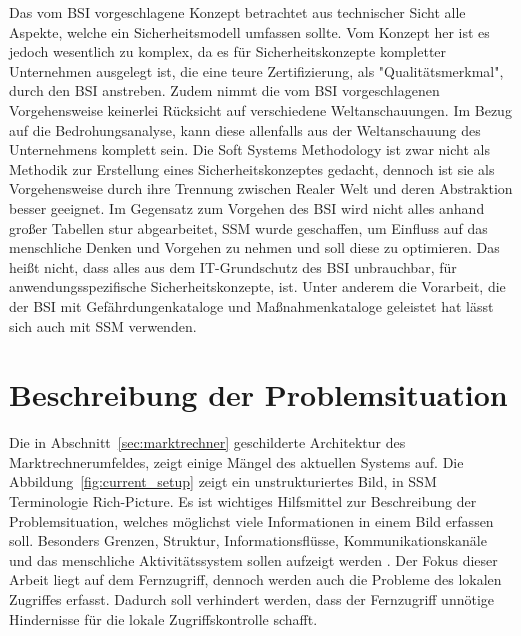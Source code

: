 \documentclass[11pt,a4paper]{report}
\begin{document}
Das vom BSI vorgeschlagene Konzept betrachtet aus technischer Sicht alle Aspekte, welche ein Sicherheitsmodell umfassen sollte. Vom Konzept her ist es jedoch wesentlich zu komplex, da es für Sicherheitskonzepte kompletter Unternehmen ausgelegt ist, die eine teure Zertifizierung, als "Qualitätsmerkmal", durch den BSI anstreben. Zudem nimmt die vom BSI vorgeschlagenen Vorgehensweise keinerlei Rücksicht auf verschiedene Weltanschauungen. Im Bezug auf die Bedrohungsanalyse, kann diese allenfalls aus der Weltanschauung des Unternehmens komplett sein. Die Soft Systems Methodology ist zwar nicht als Methodik zur Erstellung eines Sicherheitskonzeptes gedacht, dennoch ist sie als Vorgehensweise durch ihre Trennung zwischen Realer Welt und deren Abstraktion besser geeignet. Im Gegensatz zum Vorgehen des BSI wird nicht alles anhand großer Tabellen stur abgearbeitet, SSM wurde geschaffen, um Einfluss auf das menschliche Denken und Vorgehen zu nehmen und soll diese zu optimieren. Das heißt nicht, dass alles aus dem IT-Grundschutz des BSI unbrauchbar, für anwendungsspezifische Sicherheitskonzepte, ist. Unter anderem die Vorarbeit, die der BSI mit Gefährdungenkataloge und Maßnahmenkataloge geleistet hat lässt sich auch mit SSM verwenden.

\section{Beschreibung der Problemsituation} \label{sec:problem_situation}

Die in Abschnitt~\ref{sec:marktrechner} geschilderte Architektur des Marktrechnerumfeldes, zeigt einige Mängel des aktuellen Systems auf. Die Abbildung~\ref{fig:current_setup} zeigt ein unstrukturiertes Bild, in SSM Terminologie Rich-Picture. Es ist wichtiges Hilfsmittel zur Beschreibung der Problemsituation, welches möglichst viele Informationen in einem Bild erfassen soll. Besonders Grenzen, Struktur, Informationsflüsse, Kommunikationskanäle und das menschliche Aktivitätssystem sollen aufzeigt werden \cite{ssmger}. Der Fokus dieser Arbeit liegt auf dem Fernzugriff, dennoch werden auch die Probleme des lokalen Zugriffes erfasst. Dadurch soll verhindert werden, dass der Fernzugriff unnötige Hindernisse für die lokale Zugriffskontrolle schafft. 
\end{document}
